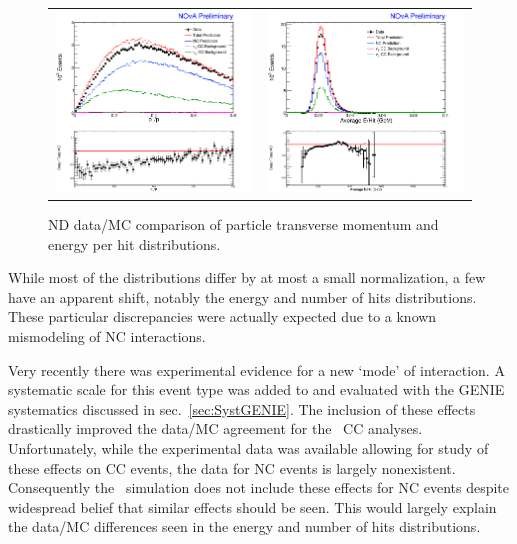 \begin{figure}[p]
  \centering
  \begin{tabular}{c c}
    \includegraphics[width=.48\textwidth]{figures/NDDataMC/PTPNusNDRat.png} &
    \includegraphics[width=.48\textwidth]{figures/NDDataMC/EpHNusNDRat.png} \\
  \end{tabular}
  \caption[ND Data/MC Comparison: Cosmic Rejection Variable Distribution]{ND data/MC comparison of particle transverse momentum and energy per hit distributions.}
  \label{fig:NDDataMCCosRej}
\end{figure}

\n While most of the distributions differ by at most a small normalization, a few have an apparent shift, notably the energy and number of hits distributions. These particular discrepancies were actually expected due to a known mismodeling of NC interactions.

Very recently there was experimental evidence for a new `mode' of interaction. A systematic scale for this event type was added to and evaluated with the GENIE systematics discussed in sec.~\ref{sec:SystGENIE}. The inclusion of these effects drastically improved the data/MC agreement for the \nova~CC analyses. Unfortunately, while the experimental data was available allowing for study of these effects on CC events, the data for NC events is largely nonexistent. Consequently the \nova~simulation does not include these effects for NC events despite widespread belief that similar effects should be seen. This would largely explain the data/MC differences seen in the energy and number of hits distributions.


